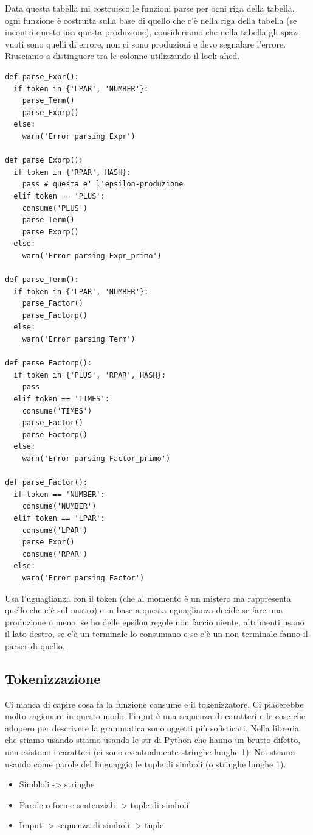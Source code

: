 Data questa tabella mi costruisco le funzioni parse per ogni riga della tabella, ogni funzione è costruita sulla base di quello che c'è nella riga della tabella (se incontri questo usa questa produzione), consideriamo che nella tabella gli spazi vuoti sono quelli di errore, non ci sono produzioni e devo segnalare l'errore. Riusciamo a distinguere tra le colonne utilizzando il look-ahed.
\begin{lstlisting}
def parse_Expr():
  if token in {'LPAR', 'NUMBER'}:
    parse_Term()
    parse_Exprp()
  else:
    warn('Error parsing Expr')

def parse_Exprp():
  if token in {'RPAR', HASH}:
    pass # questa e' l'epsilon-produzione
  elif token == 'PLUS':
    consume('PLUS')
    parse_Term()
    parse_Exprp()
  else:
    warn('Error parsing Expr_primo')

def parse_Term():
  if token in {'LPAR', 'NUMBER'}:
    parse_Factor()
    parse_Factorp()
  else:
    warn('Error parsing Term')

def parse_Factorp():
  if token in {'PLUS', 'RPAR', HASH}:
    pass
  elif token == 'TIMES':
    consume('TIMES')
    parse_Factor()
    parse_Factorp()
  else:
    warn('Error parsing Factor_primo')

def parse_Factor():
  if token == 'NUMBER':
    consume('NUMBER')
  elif token == 'LPAR':
    consume('LPAR')
    parse_Expr()
    consume('RPAR')
  else:
    warn('Error parsing Factor')
\end{lstlisting}

Usa l'uguaglianza con il token (che al momento è un mistero ma rappresenta quello che c'è sul nastro) e in base a questa uguaglianza decide se fare una produzione o meno, se ho delle epsilon regole non faccio niente, altrimenti usano il lato destro, se c'è un terminale lo consumano e se c'è un non terminale fanno il parser di quello.

\subsection{Tokenizzazione}
Ci manca di capire cosa fa la funzione consume e il tokenizzatore. Ci piacerebbe molto ragionare in questo modo, l'input è una sequenza di caratteri e le cose che adopero per descrivere la grammatica sono oggetti più sofisticati. Nella libreria che stiamo usando stiamo usando le str di Python che hanno un brutto difetto, non esistono i caratteri (ci sono eventualmente stringhe lunghe 1). Noi stiamo usando come parole del linguaggio le tuple di simboli (o stringhe lunghe 1).
\begin{itemize}
  \item Simbloli -> stringhe
  \item Parole o forme sentenziali -> tuple di simboli
  \item Imput -> sequenza di simboli -> tuple
\end{itemize}

